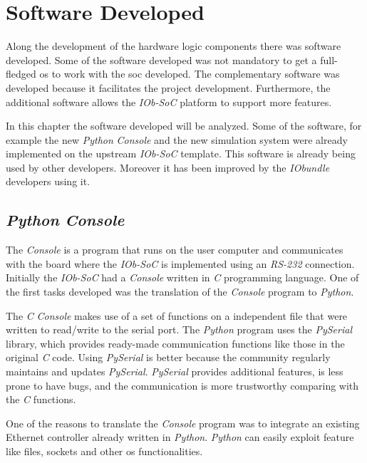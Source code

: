 \chapter{Software Developed}
\label{chapter:software_developed}
Along the development of the hardware logic components there was software developed. Some of the software developed was not mandatory to get a full-fledged \acrlong{os} to work with the \acrlong{soc} developed. The complementary software was developed because it facilitates the project development. Furthermore, the additional software allows the \textit{IOb-SoC} platform to support more features.

In this chapter the software developed will be analyzed. Some of the software, for example the new \textit{Python} \textit{Console} and the new simulation system were already implemented on the upstream \textit{IOb-SoC} template. This software is already being used by other developers. Moreover it has been improved by the \textit{IObundle} developers using it.

\section{\textit{Python} \textit{Console}}
\label{section:pyhton_console}
The \textit{Console} is a program that runs on the user computer and communicates with the board where the \textit{IOb-SoC} is implemented using an \textit{RS-232} connection. Initially the \textit{IOb-SoC} had a \textit{Console} written in \textit{C} programming language. One of the first tasks developed was the translation of the \textit{Console} program to \textit{Python}.

The \textit{C} \textit{Console} makes use of a set of functions on a independent file that were written to read/write to the serial port. The \textit{Python} program uses the \textit{PySerial} library, which provides ready-made communication functions like those in the original \textit{C} code. Using \textit{PySerial} is better because the community regularly maintains and updates \textit{PySerial}. \textit{PySerial} provides additional features, is less prone to have bugs, and the communication is more trustworthy comparing with the \textit{C} functions.

One of the reasons to translate the \textit{Console} program was to integrate an existing Ethernet controller already written in \textit{Python}. \textit{Python} can easily exploit feature like files, sockets and other \acrfull{os} functionalities.

